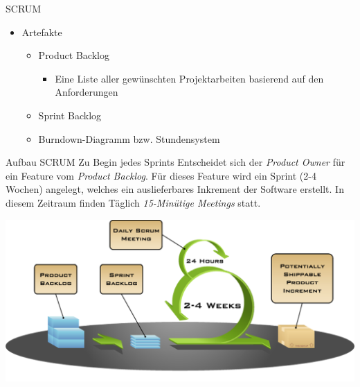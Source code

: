 \begin{defi}{SCRUM}
\begin{itemize}
\begin{itemize}
                  \item Sprint-Review
                  \item Sprint-Retrospektive
                  \item Tägliches 15-minütiges Scrum-Meeting
                        \begin{itemize}
                            \item Was hast du gestern getan?
                            \item Was wirst du heute tun?
                            \item Welche Hindernisse sind in deinem Weg?
                        \end{itemize}
              \end{itemize}
        \item Artefakte
              \begin{itemize}
                  \item Product Backlog
                        \begin{itemize}
                            \item Eine Liste aller gewünschten Projektarbeiten basierend auf den Anforderungen
                        \end{itemize}
                  \item Sprint Backlog
                  \item Burndown-Diagramm bzw. Stundensystem
              \end{itemize}
    \end{itemize}
\end{defi}

\begin{bonus}{Aufbau SCRUM}
    Zu Begin jedes Sprints Entscheidet sich der \emph{Product Owner} für ein Feature vom \emph{Product Backlog}.
    Für dieses Feature wird ein Sprint (2-4 Wochen) angelegt, welches ein auslieferbares Inkrement der Software erstellt.
    In diesem Zeitraum finden Täglich \emph{15-Minütige Meetings} statt.

    \includegraphics[width=\textwidth]{includes/figures/bonus_SCRUM.png}
\end{bonus}